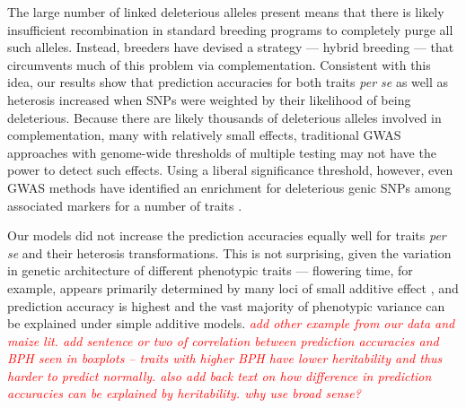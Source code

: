 \documentclass[twoside,twocolumn, letterpaper]{article}
\newcommand{\jri}[1]{\textcolor{red}{ \emph{ #1}} }
\begin{document}
The large number of linked deleterious alleles present means that there is likely insufficient recombination in standard breeding programs to completely purge all such alleles. 
Instead, breeders have devised a strategy --- hybrid breeding --- that circumvents much of this problem via complementation.
Consistent with this idea, our results show that prediction accuracies for both traits \emph{per se} as well as heterosis increased when SNPs were weighted by their likelihood of being deleterious.
Because there are likely thousands of deleterious alleles involved in complementation, many with relatively small effects, traditional GWAS approaches with genome-wide thresholds of multiple testing may not have the power to detect such effects.
Using a liberal significance threshold, however, even GWAS methods have identified an enrichment for deleterious genic SNPs among associated markers for a number of traits \citep{Mezmouk2014}.


Our models did not increase the prediction accuracies equally well for traits \emph{per se} and their heterosis transformations. 
This is not surprising, given the variation in genetic architecture of different phenotypic traits --- flowering time, for example, appears primarily determined by many loci of small additive effect \citep{buckler2009genetic}, and prediction accuracy is highest and the vast majority of phenotypic variance can be explained under simple additive models.  \jri{add other example from our data and maize lit. add sentence or two of correlation between prediction accuracies and BPH seen in boxplots -- traits with higher BPH have lower heritability and thus harder to predict normally. also add back text on how difference in prediction accuracies can be explained by heritability. why use broad sense? }

\end{document}
